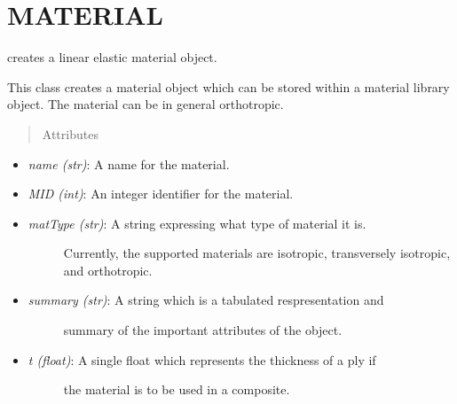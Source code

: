 \documentclass[letterpaper,10pt,english]{sphinxmanual}
\begin{document}
\section{MATERIAL}
\label{structures:material}

\begin{fulllineitems}
\label{structures:AeroComBAT.Structures.Material}
creates a linear elastic material object.

This class creates a material object which can be stored within a
material library object. The material can be in general orthotropic.
\begin{quote}\begin{description}
\item[{Attributes}] \leavevmode
\end{description}\end{quote}
\begin{itemize}
\item {} 
\emph{name (str)}: A name for the material.

\item {} 
\emph{MID (int)}: An integer identifier for the material.

\item {} \begin{description}
\item[{\emph{matType (str)}: A string expressing what type of material it is.}] \leavevmode
Currently, the supported materials are isotropic, transversely
isotropic, and orthotropic.

\end{description}

\item {} \begin{description}
\item[{\emph{summary (str)}: A string which is a tabulated respresentation and}] \leavevmode
summary of the important attributes of the object.

\end{description}

\item {} \begin{description}
\item[{\emph{t (float)}: A single float which represents the thickness of a ply if}] \leavevmode
the material is to be used in a composite.


\end{description}
\end{itemize}
\end{fulllineitems}
\end{document}
